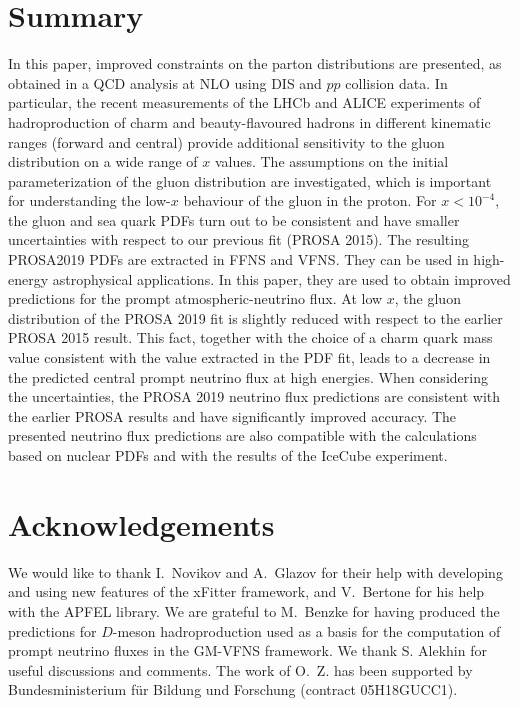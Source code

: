 \documentclass[12pt]{article}
\begin{document}
%
%


\section{Summary}
\label{sec:summary}

In this paper, improved constraints on the parton distributions are presented, as obtained in a QCD analysis at NLO using DIS and $pp$ collision data. In particular, the recent measurements of the LHCb and ALICE experiments of hadroproduction of charm and beauty-flavoured hadrons in different kinematic ranges (forward and central) provide additional sensitivity to the gluon distribution on a wide range of $x$ values. The assumptions on the initial parameterization of the gluon distribution are investigated, which is important for understanding the low-$x$ behaviour of the gluon in the proton. For $x < 10^{-4}$, the gluon and sea quark PDFs turn out to be consistent and have smaller uncertainties with respect to our previous fit (PROSA 2015). The resulting PROSA2019 PDFs are extracted in FFNS and VFNS. They can be used in high-energy astrophysical applications. In this paper, they  
 are used to obtain improved predictions for the prompt atmospheric-neutrino flux.
At low $x$, the gluon distribution of the PROSA 2019 fit is slightly reduced with respect to the earlier PROSA 2015 result. This fact, together with the choice of a charm quark mass value consistent with the value extracted in the PDF fit, leads to a decrease in the predicted central prompt neutrino flux at high energies. When considering the uncertainties, the PROSA 2019 neutrino flux predictions are consistent with the earlier PROSA results and have significantly improved accuracy. The presented neutrino flux predictions are also compatible with the calculations based on nuclear PDFs and with the results of the IceCube experiment. 


\section*{Acknowledgements}

We would like to thank I.~Novikov and A.~Glazov for their help with developing and using new features of the xFitter framework, and V.~Bertone for his help with the APFEL library. We are grateful to M.~Benzke for having produced the predictions for $D$-meson hadroproduction used as a basis for the computation of prompt neutrino fluxes in the GM-VFNS framework. We thank S. Alekhin for useful discussions and comments. The work of O.~Z. has been supported by Bundesministerium f\"ur Bildung und Forschung (contract 05H18GUCC1). 
\end{document}
